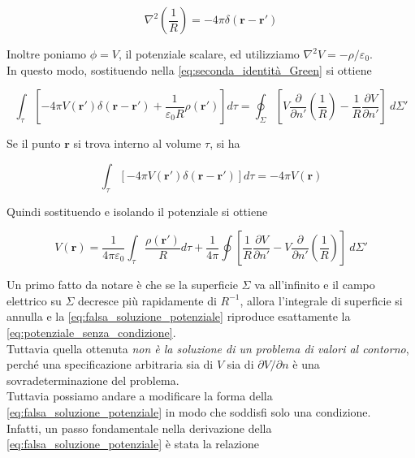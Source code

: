 \begin{equation*}
    \nabla^2 \left( \frac{1}{R} \right ) = -4 \pi \delta (\mathbf{r} - \mathbf{r'})
\end{equation*}

Inoltre poniamo $\phi = V$, il potenziale scalare, ed utilizziamo $\nabla^2 V = - \rho/\varepsilon_0$. \\
In questo modo, sostituendo nella \ref{eq:seconda_identità_Green} si ottiene 

\begin{equation*}
    \int_{\tau} \left [ -4 \pi V(\mathbf{r '}) \delta(\mathbf{r} - \mathbf{r'}) + \frac{1}{\varepsilon_0 R} \rho (\mathbf{r '})  \right ] d\tau = \oint_{\Sigma} \left[ V \frac{\partial}{\partial n'} \left(  \frac{1}{R}\right ) - \frac{1}{R} \frac{\partial V}{\partial n'}  \right ] \ d \Sigma'
\end{equation*}

Se il punto $\mathbf{r}$ si trova interno al volume $\tau$, si ha

\begin{equation*}
    \int_{\tau} [-4 \pi V(\mathbf{r'}) \delta(\mathbf{r} - \mathbf{r'})] d \tau = -4 \pi V(\mathbf{r})
\end{equation*}

Quindi sostituendo e isolando il potenziale si ottiene 

\begin{equation}
    V(\mathbf{r}) = \frac{1}{4 \pi \varepsilon_{0}} \int_{\tau} \frac{\rho(\mathbf{r'})}{R} d \tau + \frac{1}{4 \pi} \oint \left [ \frac{1}{R} \frac{\partial V}{\partial n'} - V \frac{\partial}{\partial n'} \left ( \frac{1}{R} \right ) \right ] \ d \Sigma' 
    \label{eq:falsa_soluzione_potenziale}
\end{equation}

Un primo fatto da notare è che se la superficie $\Sigma$ va all'infinito e il campo elettrico su $\Sigma$ decresce più rapidamente di $R^{-1}$, allora l'integrale di superficie si annulla e la \ref{eq:falsa_soluzione_potenziale}
riproduce esattamente la \ref{eq:potenziale_senza_condizione}. \\

Tuttavia quella ottenuta \emph{non è la soluzione di un problema di valori al contorno}, perché una specificazione arbitraria sia di $V$ sia di $\partial V / \partial n$ è una sovradeterminazione del problema. \\

Tuttavia possiamo andare a modificare la forma della \ref{eq:falsa_soluzione_potenziale} in modo che soddisfi solo una condizione. \\
Infatti, un passo fondamentale nella derivazione della \ref{eq:falsa_soluzione_potenziale} è stata la relazione

